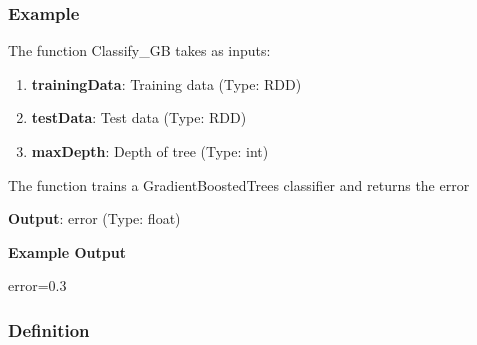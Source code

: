 \documentclass[11pt]{article}
\providecommand{\tightlist}{%
      \setlength{\itemsep}{0pt}\setlength{\parskip}{0pt}}
\newenvironment{Shaded}{}{}
\newcommand{\FloatTok}[1]{\textcolor[rgb]{0.25,0.63,0.44}{{#1}}}
\newcommand{\NormalTok}[1]{{#1}}
\newcommand{\OperatorTok}[1]{\textcolor[rgb]{0.40,0.40,0.40}{{#1}}}
\begin{document}
    \subsubsection{Example}\label{example}

The function Classify\_GB takes as inputs:

\begin{enumerate}
\def\labelenumi{\arabic{enumi}.}
\tightlist
\item
  \textbf{trainingData}: Training data (Type: RDD)
\item
  \textbf{testData}: Test data (Type: RDD)
\item
  \textbf{maxDepth}: Depth of tree (Type: int)
\end{enumerate}

The function trains a GradientBoostedTrees classifier and returns the
error

\textbf{Output}: error (Type: float)

\textbf{Example Output}

\begin{Shaded}
\begin{Highlighting}[]
\NormalTok{error}\OperatorTok{=}\FloatTok{0.3}
\end{Highlighting}
\end{Shaded}

    \subsubsection{Definition}\label{definition}
\end{document}
